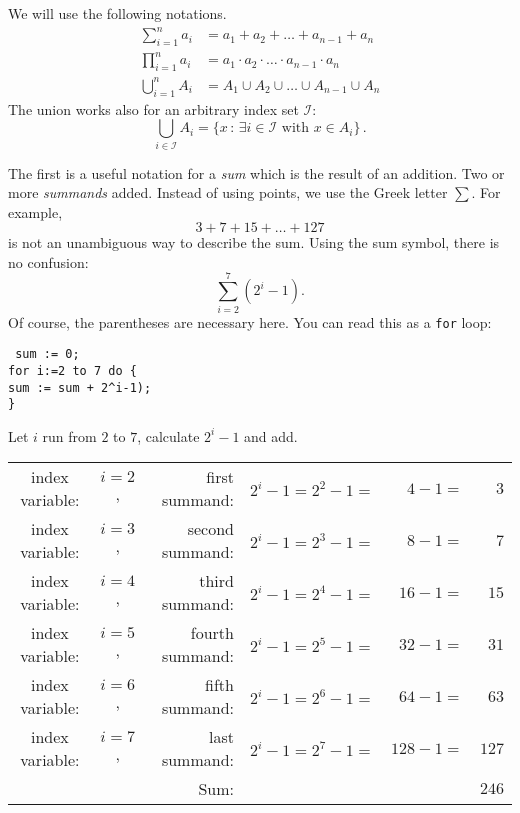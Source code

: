 
We will use the following notations.
\begin{align*}
 \sum_{i=1}^n a_i &= a_1+a_2+\dots+a_{n-1}+a_n\\
 \prod_{i=1}^n a_i &= a_1 \cdot a_2 \cdot \dots \cdot a_{n-1}\cdot a_n\\
 \bigcup_{i=1}^n A_i &= A_1 \cup A_2 \cup \dots \cup A_{n-1}\cup A_n
\end{align*}
The union works also for an arbitrary index set $\mathcal{I}$:
$$
	\bigcup_{i \in \mathcal{I}} A_i = \{ x \,:\, \exists i \in \mathcal{I} \text{ with } x \in A_i \} \,.
$$

The first is a useful notation for a \emph{sum} which is the result of an addition. Two or
more \emph{summands} added. Instead of using points, we use the Greek letter $\sum$. For example,
\[
3+7+15+\ldots+127 
\]
is not an unambiguous way to describe the sum. 
Using the sum symbol, there is no confusion:
\begin{equation*} %
\sum_{i=2}^7 (2^i-1).
\end{equation*}
Of course, the parentheses are necessary here.
You can read this as a {\texttt{for}} loop:

\begin{Boxx}
\textnormal{\texttt{
\hspace*{10mm}sum := 0;\\
\hspace*{10mm}for i:=2 to 7 do \{\\
\hspace*{15mm}sum := sum + 2^i-1);\\
\hspace*{10mm}\}
}
}
\end{Boxx}

\begin{Faust}
Let $i$ run from $2$ to $7${,} calculate $2^i-1$
and add.
\begin{tabular}{ccrrrr}
index variable: & $i=2$, & first summand: & $2^i-1=2^2-1=$&$4-1=$&$3$\\
index variable: & $i=3$, & second summand: & $2^i-1=2^3-1=$&$8-1=$&$7$\\
index variable: & $i=4$, & third summand: & $2^i-1=2^4-1=$&$16-1=$&$15$\\
index variable: & $i=5$, & fourth summand: & $2^i-1=2^5-1=$&$32-1=$&$31$\\
index variable: & $i=6$, & fifth summand: & $2^i-1=2^6-1=$&$64-1=$&$63$\\
index variable: & $i=7$, & last summand: & $2^i-1=2^7-1=$&\!\!$128-1=$&$127$\\
\hline
 & & Sum: & & &$246$
\end{tabular}
\end{Faust}

